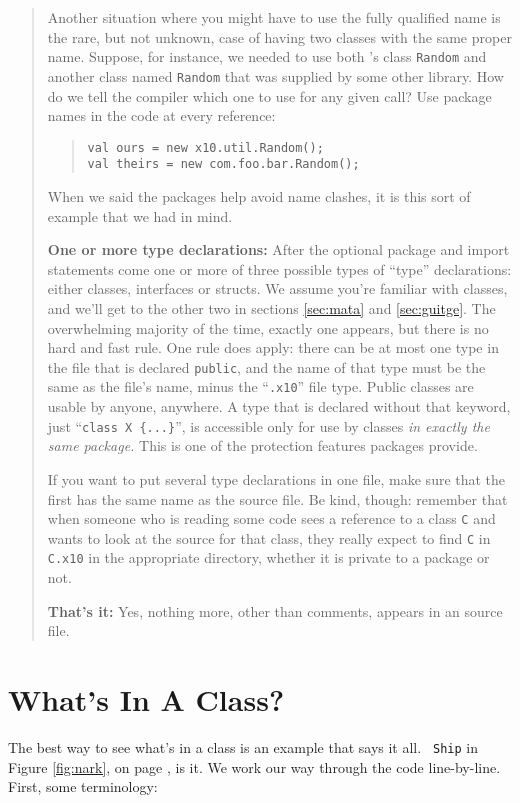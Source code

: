 \begin{quote}
Another situation where you might have to use the fully qualified name is the
rare, but not unknown, case of having two classes with the same proper
name.  
Suppose, for instance, we needed to use both \Xten's class {\tt Random}
and another class named {\tt Random} that was supplied by some other
library.  How do we tell the compiler which one to use for any given call?
Use package names in the code at every reference:
\begin{quote}
\begin{verbatim}
val ours = new x10.util.Random();
val theirs = new com.foo.bar.Random();
\end{verbatim}
\end{quote}
When we said the packages help avoid name clashes, it is this sort of
example that we had in mind.

{\bf One or more type declarations:}  After the optional package and import 
statements come one or more of three possible types of ``type'' declarations:
either classes, interfaces or structs.  We assume you're familiar with classes,
and we'll get to the other two in sections \ref{sec:mata} and \ref{sec:guitge}.
The overwhelming majority of the
time, exactly one appears, but there is no hard and fast rule.  One rule does
apply: there can be at most one type in the file that is declared {\tt public}, 
and the name of that type must be the same as the file's name, minus the
``{\tt .x10}'' file type.
Public classes are usable by anyone, anywhere. 
A type that is declared without that keyword, \eg{} just ``{\tt class X \{...\}}'',
is accessible only for use by classes {\em in exactly the same package.}
This is one of the protection features packages provide. 

If you want to put several type declarations in one file, make sure that the first has the
same name as the source file.  Be kind, though: remember that when someone who
is reading some \Xten{} code sees a reference to a class {\tt C} and wants to
look at the source for that class, they really expect
to find {\tt C} in {\tt C.x10} in the appropriate directory, whether it is
private to a package or not.

{\bf That's it:}  Yes, nothing more, other than comments, appears in an \Xten{} source file.
\end{quote}
\section{What's In A Class?}

The best way to see what's in a class is an example that says it all. {\tt
Ship} in Figure \ref{fig:nark}, on page \pageref{fig:nark}, is it.
We work our way through the code
line-by-line. First, some terminology:

